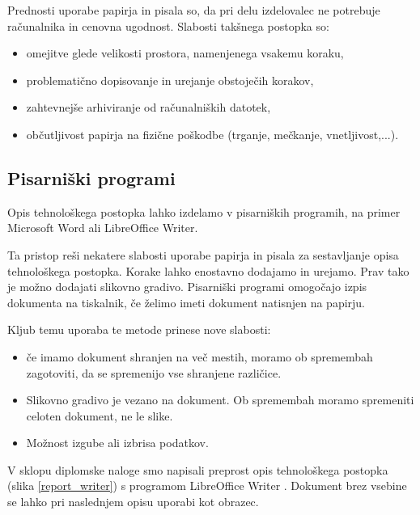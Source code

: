 \documentclass[a4paper, 12pt]{book}
\begin{document}
Prednosti uporabe papirja in pisala so, da pri delu izdelovalec ne potrebuje računalnika in cenovna ugodnost.
Slabosti takšnega postopka so:
\begin{itemize}
	\item omejitve glede velikosti prostora, namenjenega vsakemu koraku,
	\item problematično dopisovanje in urejanje obstoječih korakov,
	\item zahtevnejše arhiviranje od računalniških datotek,
	\item občutljivost papirja na fizične poškodbe (trganje, mečkanje, vnetljivost,...).
\end{itemize}


\subsection{Pisarniški programi}

Opis tehnološkega postopka lahko izdelamo v pisarniških programih, na primer Microsoft Word ali LibreOffice Writer.

Ta pristop reši nekatere slabosti uporabe papirja in pisala za sestavljanje opisa tehnološkega postopka.
Korake lahko enostavno dodajamo in urejamo.
Prav tako je možno dodajati slikovno gradivo.
Pisarniški programi omogočajo izpis dokumenta na tiskalnik, če želimo imeti dokument natisnjen na papirju.

Kljub temu uporaba te metode prinese nove slabosti:
\begin{itemize}
	\item če imamo dokument shranjen na več mestih, moramo ob spremembah zagotoviti, da se spremenijo vse shranjene različice. 
	\item Slikovno gradivo je vezano na dokument. Ob spremembah moramo spremeniti celoten dokument, ne le slike.
	\item Možnost izgube ali izbrisa podatkov.
\end{itemize}

V sklopu diplomske naloge smo napisali preprost opis tehnološkega postopka (slika \ref{report_writer}) s programom LibreOffice Writer \cite{writer}.
Dokument brez vsebine se lahko pri naslednjem opisu uporabi kot obrazec.
\end{document}
